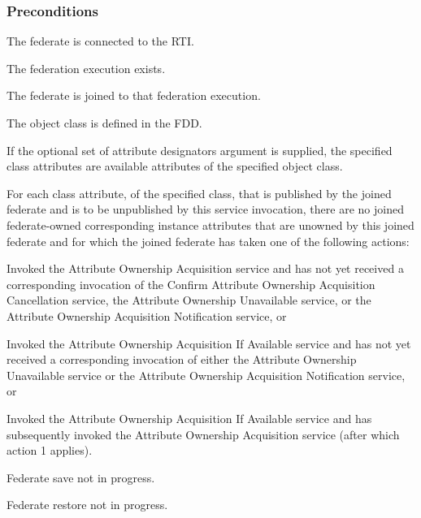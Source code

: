 \begin{compactstdpage}
    \subsubsection{Preconditions}
    \begin{stdalphalist}
        \item The federate is connected to the RTI.
        \item The federation execution exists.
        \item The federate is joined to that federation execution.
        \item The object class is defined in the FDD.
        \item If the optional set of attribute designators argument is supplied, the specified class attributes are available attributes of the specified object class.
        \item For each class attribute, of the specified class, that is published by the joined federate and is to be unpublished by this service invocation, there are no joined federate-owned corresponding instance attributes that are unowned by this joined federate and for which the joined federate has taken one of the following actions:
        \begin{stdnumlist}
            \item Invoked the Attribute Ownership Acquisition service and has not yet received a corresponding invocation of the Confirm Attribute Ownership Acquisition Cancellation \rtiinitiated{} service, the Attribute Ownership Unavailable \rtiinitiated{} service, or the Attribute Ownership Acquisition Notification \rtiinitiated{} service, or
            \item Invoked the Attribute Ownership Acquisition If Available service and has not yet received a corresponding invocation of either the Attribute Ownership Unavailable \rtiinitiated{} service or the Attribute Ownership Acquisition Notification \rtiinitiated{} service, or
            \item Invoked the Attribute Ownership Acquisition If Available service and has subsequently invoked the Attribute Ownership Acquisition service (after which action 1 applies).
        \end{stdnumlist}
        \item Federate save not in progress.
        \item Federate restore not in progress.
    \end{stdalphalist}


\end{compactstdpage}
